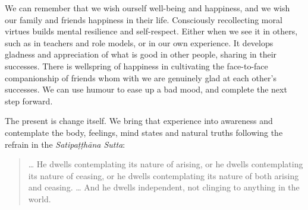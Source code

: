 We can remember that we wish ourself well-being and happiness, and we
wish our family and friends happiness in their life. Consciously
recollecting moral virtues builds mental resilience and self-respect.
Either when we see it in others, such as in teachers and role models, or
in our own experience. It develops gladness and appreciation of what is
good in other people, sharing in their successes. There is wellspring of
happiness in cultivating the face-to-face companionship of friends whom
with we are genuinely glad at each other's successes. We can use humour
to ease up a bad mood, and complete the next step forward.

The present is change itself. We bring that experience into awareness
and contemplate the body, feelings, mind states and natural truths
following the refrain in the \emph{Satipaṭṭhāna Sutta}:

\begin{quote}
\ldots{} He dwells contemplating its nature of arising, or he dwells
contemplating its nature of ceasing, or he dwells contemplating its
nature of both arising and ceasing. \ldots{} And he dwells independent,
not clinging to anything in the world.

\bigskip

\end{quote}
